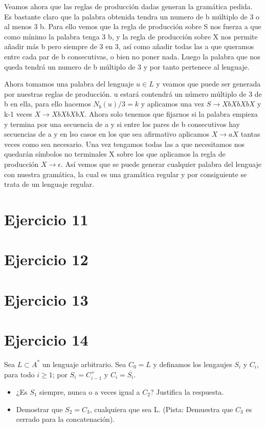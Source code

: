 \documentclass[a4paper,11pt]{article}
\begin{document}
Veamos ahora que las reglas de producción dadas generan la gramática pedida. Es bastante claro que la palabra obtenida tendra un numero de b múltiplo de 3 o al menos 3 b. Para ello vemos que la regla de producción sobre S nos fuerza a que como mínimo la palabra tenga 3 b, y la regla de producción sobre X nos permite añadir más b pero siempre de 3 en 3, así como añadir todas las a que queramos entre cada par de b consecutivas, o bien no poner nada. Luego la palabra que nos queda tendrá un numero de b múltiplo de 3 y por tanto pertenece al lenguaje.

Ahora tomamos una palabra del lenguaje $u \in L$ y veamos que puede ser generada por nuestras reglas de producción. u estará contendrá un número múltiplo de 3 de b en ella, para ello hacemos $N_b(u)/3=k$ y aplicamos una vez $S \rightarrow XbXbXbX$ y k-1 veces $X \rightarrow XbXbXbX$. Ahora solo tenemos que fijarnos si la palabra empieza y termina por una secuencia de a y si entre los pares de b consecutivos hay secuencias de a y en lso casos en los que sea afirmativo aplicamos $X \rightarrow aX$ tantas veces como sea necesario. Una vez tengamos todas las a que necesitamos nos quedarán símbolos no terminales X sobre los que aplicamos la regla de producción $X \rightarrow \epsilon$. Así vemos que se puede generar cualquier palabra del lenguaje con nuestra gramática, la cual es una gramática regular y por consiguiente se trata de un lenguaje regular.


\section{Ejercicio 11}
\section{Ejercicio 12}
\section{Ejercicio 13}
\section{Ejercicio 14}
Sea $L \subset A^*$ un lenguaje arbitrario. Sea $C_0 = L$ y definamos los lengaujes $S_i$ y $C_i$, para todo $i \geq 1$; por $S_i=C_{i-1}^+$ y $C_i = \overline{S_i}$.

\begin{itemize}
\item ¿Es $S_1$ siempre, nunca o a veces igual a $C_2$? Justifica la respuesta.
\item Demostrar que $S_2 = C_3$, cualquiera que sea L. (Pista: Demuestra que $C_3$ es cerrado para la concatenación).
\end{itemize}
\end{document}
